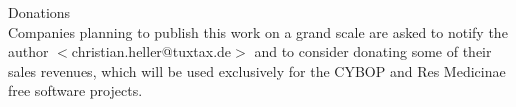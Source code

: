 {%
}

\small{Donations\\
    Companies planning to publish this work on a grand scale are asked to
    notify the author \(<\)christian.heller@tuxtax.de\(>\) and to consider
    donating some of their sales revenues, which will be used exclusively for
    the CYBOP and Res Medicinae free software projects.}


